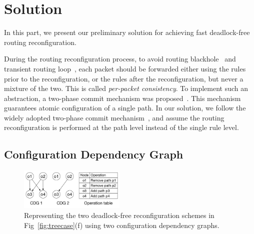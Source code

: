\section{Solution}\label{sec:solution}

In this part, we present our preliminary solution for achieving fast deadlock-free routing reconfiguration.

During the routing reconfiguration process, to avoid routing blackhole~\cite{everflow} and transient routing loop~\cite{dionysus}, each packet should be forwarded either using the rules prior to the reconfiguration, or the rules after the reconfiguration, but never a mixture of the two. This is called \textit{per-packet consistency}. To implement such an abstraction, a two-phase commit mechanism was proposed~\cite{abstractionforupdate}. This mechanism guarantees atomic configuration of a single path. In our solution, we follow the widely adopted two-phase commit mechanism~\cite{abstractionforupdate,zupdate,dionysus}, and assume the routing reconfiguration is performed at the path level instead of the single rule level.


\subsection{Configuration Dependency Graph}\label{subsec:cdg}

\begin{figure}[t]
	\centering
	\includegraphics[width=0.45\textwidth] {figs/CDG}
	\caption{Representing the two deadlock-free reconfiguration schemes in Fig~\ref{fig:treecase}(f) using two configuration dependency graphs.}\label{fig:cdg}
	\vspace{-0.15in}
\end{figure}

